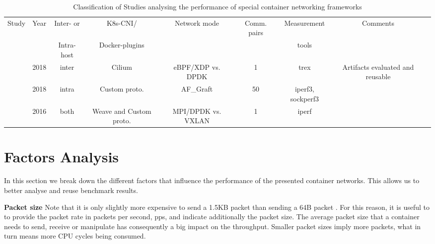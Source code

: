 \documentclass[conference]{IEEEtran}
\begin{document}
\begin{table}[h]

 \begin{center}

   \caption{ Classification of Studies analysing the performance of special container networking frameworks}\label{tab:1}

   \begin{tabular}{c c c c c c c c c}
     \hline
     Study & Year & Inter- or & K8s-CNI/& Network mode & Comm. pairs & Measurement& Comments  \\ 
      &  & Intra-host & Docker-plugins & & & tools &   \\ 
     \hline
     \cite{CoNEXT:2018} & 2018 & inter & Cilium & eBPF/XDP vs. DPDK & 1 & trex & Artifacts evaluated and reusable & \\
     \cite{Nakamura:2018} & 2018 & intra & Custom proto. & AF\_Graft & 50 & iperf3, sockperf3 & \\     
     \cite{HotNets:16:FreeFlow} & 2016 & both & Weave and Custom proto. & MPI/DPDK vs. VXLAN &1 & iperf & & \\
     \hline 

   \end{tabular}

 \end{center}
\end{table} 

\section{Factors Analysis}
In this section we break down the different factors that influence the performance of the presented container networks. This allows us to better analyse and reuse benchmark results.

\noindent\textbf{Packet size}\hspace{0.2cm} 
Note that it is only slightly more expensive to send a 1.5KB packet than sending a 64B packet \cite{Rizzo:2012}. For this reason, it is useful to to provide the packet rate in packets per second, pps, and indicate additionally the packet size. The average packet size that a container needs to send, receive or manipulate has consequently a big impact on the throughput. Smaller packet sizes imply more packets, what in turn means more CPU cycles being consumed.
\end{document}
